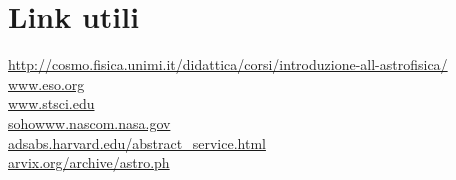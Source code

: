\chapter{Link utili}

\url{http://cosmo.fisica.unimi.it/didattica/corsi/introduzione-all-astrofisica/}\\
\url{www.eso.org}\\
\url{www.stsci.edu}\\
\url{sohowww.nascom.nasa.gov}\\
\url{adsabs.harvard.edu/abstract_service.html}\\
\url{arvix.org/archive/astro.ph}